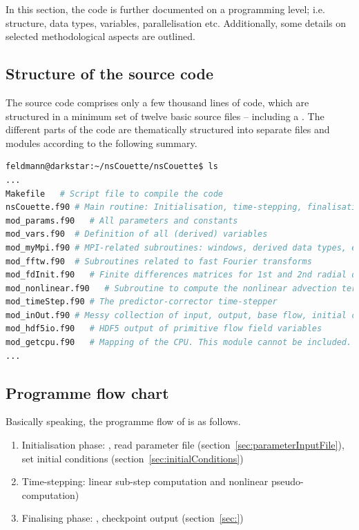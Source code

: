 \documentclass[a4paper, 11pt, DIV=11]{scrartcl}
\begin{document}
In this section, the code is further documented on a programming level; i.e. structure,
data types, variables, parallelisation etc. Additionally, some details on selected
methodological aspects are outlined.

\subsection{Structure of the source code}
\label{sec:codeStructures}

The source code comprises only a few thousand lines of code, which are structured in
a minimum set of twelve basic source files -- including a . The different
parts of the code are thematically structured into separate files and \fortran modules
according to the following summary.
\begin{lstlisting}[language=bash]
feldmann@darkstar:~/nsCouette/nsCouette$ ls
...
Makefile   # Script file to compile the code
nsCouette.f90 # Main routine: Initialisation, time-stepping, finalisation
mod_params.f90   # All parameters and constants
mod_vars.f90  # Definition of all (derived) variables
mod_myMpi.f90 # MPI-related subroutines: windows, derived data types, etc.
mod_fftw.f90  # Subroutines related to fast Fourier transforms
mod_fdInit.f90   # Finite differences matrices for 1st and 2nd radial derivatives
mod_nonlinear.f90   # Subroutine to compute the nonlinear advection term (pseudo-spectral) 
mod_timeStep.f90 # The predictor-corrector time-stepper
mod_inOut.f90 # Messy collection of input, output, base flow, initial conditions
mod_hdf5io.f90   # HDF5 output of primitive flow field variables
mod_getcpu.f90   # Mapping of the CPU. This module cannot be included.
...
\end{lstlisting}

\subsection{Programme flow chart}
\label{sec:programmeFlowChart}

Basically speaking, the programme flow of \nsc is as follows.
\begin{enumerate}
\item Initialisation phase: \mpi, read parameter file (section~\ref{sec:parameterInputFile}), set initial conditions (section~\ref{sec:initialConditions}) 
\item Time-stepping: linear sub-step computation and nonlinear pseudo-computation)
\item Finalising phase: \mpi, checkpoint output (section~\ref{sec:})
\end{enumerate}
\end{document}
